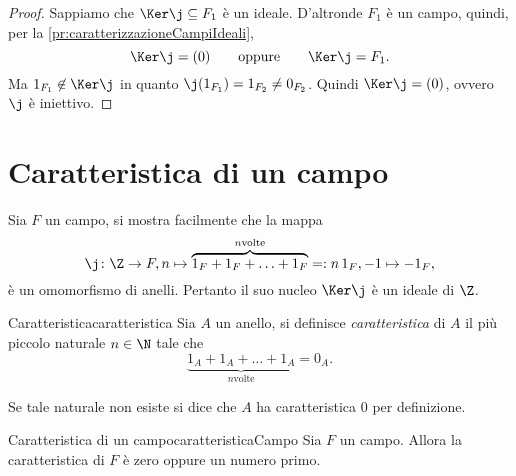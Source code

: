 \begin{proof}
	Sappiamo che \(\Ker \j \subseteq F_1\) è un ideale.
	D'altronde \(F_1\) è un campo, quindi, per la \autoref{pr:caratterizzazioneCampiIdeali},
	\[
		\Ker \j = (0) \qquad\text{oppure}\qquad \Ker \j = F_1.
	\]
	Ma \(1_{F_1}\not\in \Ker\j\) in quanto \(\j(1_{F_1})=1_{F_2}\neq 0_{F_2}\).
	Quindi \(\Ker \j = (0)\), ovvero \(\j\) è iniettivo.
\end{proof}
\section{Caratteristica di un campo}

Sia \(F\) un campo, si mostra facilmente che la mappa
\[
	\j\colon \Z \to F, n\mapsto \overbrace{1_F+1_F+\ldots+1_F}^{n \text{volte}} =: n\,1_F, -1 \mapsto -1_F,
\]
è un omomorfismo di anelli. Pertanto il suo nucleo \(\Ker \j\) è un ideale di \(\Z\).

\begin{defn}{Caratteristica}{caratteristica}
	Sia \(A\) un anello, si definisce \emph{caratteristica} di \(A\) il più piccolo naturale \(n\in \N\) tale che
	\[
		\underbrace{1_A+1_A+\ldots+1_A}_{n \text{volte}} = 0_A.
	\]
\end{defn}

\begin{notz}
	Se tale naturale non esiste si dice che \(A\) ha caratteristica \(0\) per definizione.
\end{notz}

\begin{teor}{Caratteristica di un campo}{caratteristicaCampo}
	Sia \(F\) un campo.
	Allora la caratteristica di \(F\) è zero oppure un numero primo.
\end{teor}

